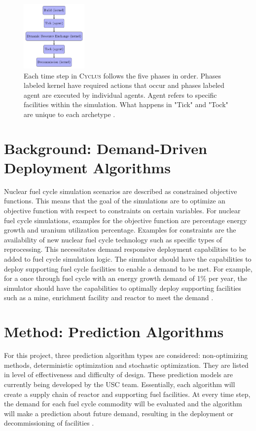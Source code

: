 \documentclass{anstrans}
\newcommand{\Cyclus}{\textsc{Cyclus}\xspace}%
\begin{document}
\begin{figure}[ht] %
	\centering
	\includegraphics[width=0.29\textwidth]{timeexecution}
	\caption{Each time step in \Cyclus follows the five phases in order. Phases labeled kernel have required actions that occur and phases labeled agent are executed by individual agents. Agent refers to specific facilities within the simulation. What happens in "Tick" and "Tock" are unique to each archetype \cite{bae_numerical_2018}. }
	\label{fig:timeexecution}
\end{figure}

\section{Background: Demand-Driven Deployment Algorithms}
Nuclear fuel cycle simulation scenarios are described as constrained objective functions. This means that the goal of the simulations are to optimize an objective function with respect to constraints on certain variables. For nuclear fuel cycle simulations, examples for the objective function are percentage energy growth and uranium utilization percentage.  Examples for constraints are the availability of new nuclear fuel cycle technology such as specific types of reprocessing. This necessitates demand responsive deployment capabilities to be added to fuel cycle simulation logic. The simulator should have the capabilities to deploy supporting fuel cycle facilities to enable a demand to be met. For example, for a once through fuel cycle with an energy growth demand of 1\% per year, the simulator should have the capabilities to optimally deploy supporting facilities such as a mine, enrichment facility and reactor to meet the demand \cite{huff_current_2017}. 

\section{Method: Prediction Algorithms}
For this project, three prediction algorithm types are considered: non-optimizing methods, deterministic optimization and stochastic optimization. They are listed in level of effectiveness and difficulty of design. These prediction models are currently being developed by the USC team. Essentially, each algorithm will create a supply chain of reactor and supporting fuel facilities. At every time step, the demand for each fuel cycle commodity will be evaluated and the algorithm will make a prediction about future demand, resulting in the deployment or decommissioning of facilities \cite{bae_numerical_2018}. 
\end{document}
